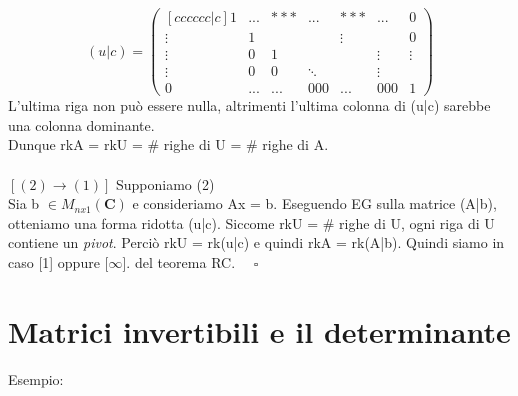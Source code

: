 \documentclass[12pt]{article}
\begin{document}
\[(u|c) = \begin{pmatrix}[cccccc|c]
    1 & ... & *** & ... & *** & ... & 0\\
    \vdots & 1 & & & \vdots & & 0\\
    \vdots & 0 & 1 & & & \vdots & \vdots\\
    \vdots & 0 & 0 & \ddots & & \vdots\\
    0 & ... & ... & 000 & ... & 000 & 1
\end{pmatrix}\]L'ultima riga non può essere nulla, altrimenti l'ultima colonna di (u|c) sarebbe una colonna dominante.
\\
Dunque rkA = rkU = $\#$ righe di U = $\#$ righe di A.
\\\\
$[(2) \longrightarrow (1)]$ Supponiamo (2)\\
Sia b $\in M_{nx1} (\mathbf{C})$ e consideriamo Ax = b. Eseguendo EG sulla matrice (A|b), otteniamo una forma ridotta (u|c). Siccome rkU = $\#$ righe di U, ogni riga di U contiene un \textit{pivot}. Perciò rkU = rk(u|c) e quindi rkA = rk(A|b). Quindi siamo in caso [1] oppure [$\infty$]. del teorema RC. $\quad \square$

\pagebreak

\section{Matrici invertibili e il determinante}
Esempio:
\end{document}
